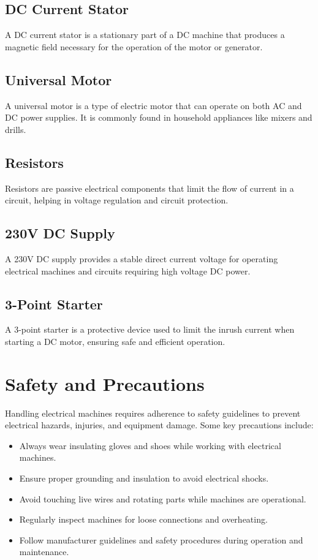 \documentclass[a4paper,12pt]{article}
\begin{document}
	\subsection{DC Current Stator}
	A DC current stator is a stationary part of a DC machine that produces a magnetic field necessary for the operation of the motor or generator.
	
	\subsection{Universal Motor}
	A universal motor is a type of electric motor that can operate on both AC and DC power supplies. It is commonly found in household appliances like mixers and drills.
	
	\subsection{Resistors}
	Resistors are passive electrical components that limit the flow of current in a circuit, helping in voltage regulation and circuit protection.
	
	\subsection{230V DC Supply}
	A 230V DC supply provides a stable direct current voltage for operating electrical machines and circuits requiring high voltage DC power.
	
	\subsection{3-Point Starter}
	A 3-point starter is a protective device used to limit the inrush current when starting a DC motor, ensuring safe and efficient operation.
	
	\section{Safety and Precautions}
	Handling electrical machines requires adherence to safety guidelines to prevent electrical hazards, injuries, and equipment damage. Some key precautions include:
	\begin{itemize}
		\item Always wear insulating gloves and shoes while working with electrical machines.
		\item Ensure proper grounding and insulation to avoid electrical shocks.
		\item Avoid touching live wires and rotating parts while machines are operational.
		\item Regularly inspect machines for loose connections and overheating.
		\item Follow manufacturer guidelines and safety procedures during operation and maintenance.
	\end{itemize}
	
\end{document}
